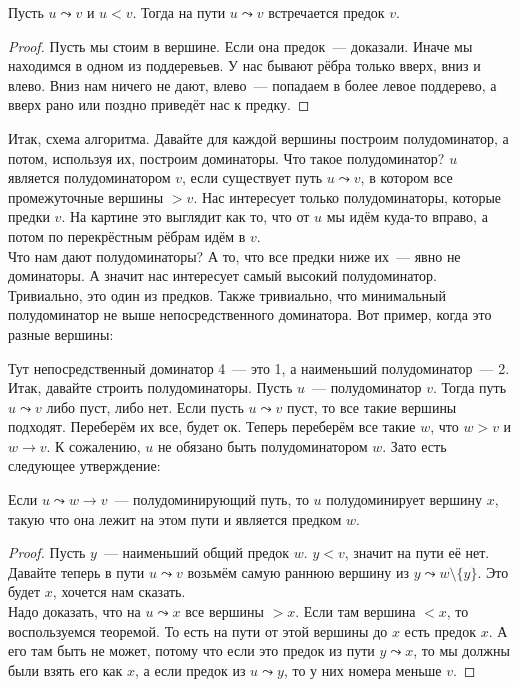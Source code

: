 \documentclass{article}
\begin{document}
    \begin{theorem}
        Пусть $u\leadsto v$ и $u<v$. Тогда на пути $u\leadsto v$ встречается предок $v$.
    \end{theorem}
    \begin{proof}
        Пусть мы стоим в вершине. Если она предок~--- доказали. Иначе мы находимся в одном из поддеревьев. У нас бывают рёбра только вверх, вниз и влево. Вниз нам ничего не дают, влево~--- попадаем в более левое поддерево, а вверх рано или поздно приведёт нас к предку.
    \end{proof}\noindent
    Итак, схема алгоритма. Давайте для каждой вершины построим полудоминатор, а потом, используя их, построим доминаторы. Что такое полудоминатор? $u$ является полудоминатором $v$, если существует путь $u\leadsto v$, в котором все промежуточные вершины ${}>v$. Нас интересует только полудоминаторы, которые предки $v$. На картине это выглядит как то, что от $u$ мы идём куда-то вправо, а потом по перекрёстным рёбрам идём в $v$.\\
    Что нам дают полудоминаторы? А то, что все предки ниже их~--- явно не доминаторы. А значит нас интересует самый высокий полудоминатор. Тривиально, это один из предков. Также тривиально, что минимальный полудоминатор не выше непосредственного доминатора. Вот пример, когда это разные вершины:
    \begin{figure}[H]
    \end{figure}\noindent
    Тут непосредственный доминатор 4~--- это 1, а наименьший полудоминатор~--- 2.\\
    Итак, давайте строить полудоминаторы. Пусть $u$~--- полудоминатор $v$. Тогда путь $u\leadsto v$ либо пуст, либо нет. Если пусть $u\leadsto v$ пуст, то все такие вершины подходят. Переберём их все, будет ок. Теперь переберём все такие $w$, что $w>v$ и $w\to v$. К сожалению, $u$ не обязано быть полудоминатором $w$. Зато есть следующее утверждение:
    \begin{claim}
        Если $u\leadsto w\to v$~--- полудоминирующий путь, то $u$ полудоминирует вершину $x$, такую что она лежит на этом пути и является предком $w$.
    \end{claim}
    \begin{proof}
        Пусть $y$~--- наименьший общий предок $w$. $y<v$, значит на пути её нет. Давайте теперь в пути $u\leadsto v$ возьмём самую раннюю вершину из $y\leadsto w\setminus\{y\}$. Это будет $x$, хочется нам сказать.\\
        Надо доказать, что на $u\leadsto x$ все вершины $>x$. Если там вершина $<x$, то воспользуемся теоремой. То есть на пути от этой вершины до $x$ есть предок $x$. А его там быть не может, потому что если это предок из пути $y\leadsto x$, то мы должны были взять его как $x$, а если предок из $u\leadsto y$, то у них номера меньше $v$.
    \end{proof}
\end{document}
